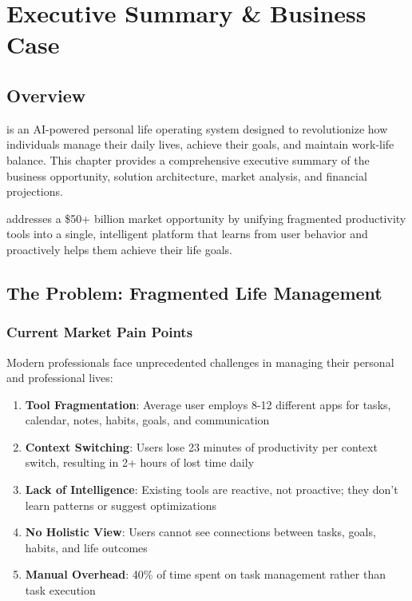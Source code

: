 \chapter{Executive Summary \& Business Case}
\label{ch:executive-summary}

\section{Overview}

\lifeos{} is an AI-powered personal life operating system designed to revolutionize how individuals manage their daily lives, achieve their goals, and maintain work-life balance. This chapter provides a comprehensive executive summary of the business opportunity, solution architecture, market analysis, and financial projections.

\begin{keypoint}
\lifeos{} addresses a \$50+ billion market opportunity by unifying fragmented productivity tools into a single, intelligent platform that learns from user behavior and proactively helps them achieve their life goals.
\end{keypoint}

\section{The Problem: Fragmented Life Management}

\subsection{Current Market Pain Points}

Modern professionals face unprecedented challenges in managing their personal and professional lives:

\begin{enumerate}
    \item \textbf{Tool Fragmentation}: Average user employs 8-12 different apps for tasks, calendar, notes, habits, goals, and communication
    \item \textbf{Context Switching}: Users lose 23 minutes of productivity per context switch, resulting in 2+ hours of lost time daily
    \item \textbf{Lack of Intelligence}: Existing tools are reactive, not proactive; they don't learn patterns or suggest optimizations
    \item \textbf{No Holistic View}: Users cannot see connections between tasks, goals, habits, and life outcomes
    \item \textbf{Manual Overhead}: 40\% of time spent on task management rather than task execution
\end{enumerate}

